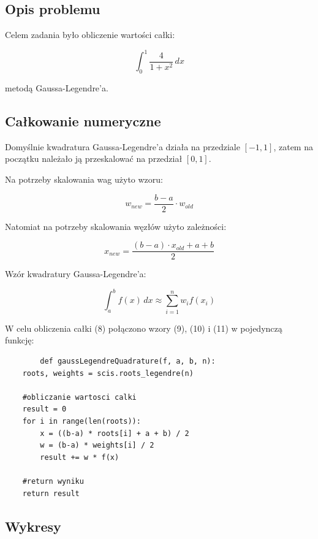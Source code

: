 \documentclass{article}
\begin{document}
	\subsection*{Opis problemu}

	Celem zadania było obliczenie wartości całki:

	\begin{equation}
		\int_{0}^{1} \frac{4}{1 + x^2} \,dx 
	\end{equation}

	metodą Gaussa-Legendre'a.
	
	
	\subsection*{Całkowanie numeryczne}

	Domyślnie kwadratura Gaussa-Legendre'a działa na przedziale $[-1, 1]$, zatem na początku należało ją przeskalować na przedział $[0,1]$. 

	Na potrzeby skalowania wag użyto wzoru:

	\begin{equation}
		w_{new} = \frac{b - a}{2} \cdot w_{old}
	\end{equation}

	Natomiat na potrzeby skalowania węzłów użyto zależności:

	\begin{equation}
		x_{new} = \frac{(b - a) \cdot x_{old} + a + b}{2}
	\end{equation}

	Wzór kwadratury Gaussa-Legendre'a:

	\begin{equation}
		\int_{a}^{b} f(x) \,dx \approx \sum_{i=1}^{n} w_i f(x_i)
	\end{equation}

	W celu obliczenia całki (8) połączono wzory (9), (10) i (11) w pojedynczą funkcję:
	

	\begin{verbatim}
		def gaussLegendreQuadrature(f, a, b, n):
    roots, weights = scis.roots_legendre(n)

    #obliczanie wartosci calki
    result = 0
    for i in range(len(roots)):
        x = ((b-a) * roots[i] + a + b) / 2
        w = (b-a) * weights[i] / 2
        result += w * f(x)
    
    #return wyniku
    return result
	\end{verbatim}

	\subsection*{Wykresy}
\end{document}
